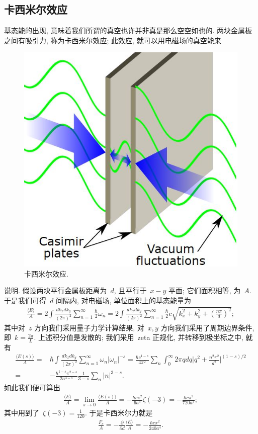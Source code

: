 \subsection{卡西米尔效应}


基态能的出现, 意味着我们所谓的真空也许并非真是那么空空如也的. 两块金属板之间有吸引力, 称为卡西米尔效应; 此效应, 就可以用电磁场的真空能来
\begin{figure}[!h]
\begin{center}
\includegraphics[width=5 cm]{pic/Casimir.jpg}
\caption{卡西米尔效应.}
\label{Casimir}
\end{center}
\end{figure}
说明. 假设两块平行金属板距离为~$d$, 且平行于~$x-y$ 平面; 它们面积相等, 为~$A$. 于是我们可得~$d$ 间隔内, 对电磁场, 单位面积上的基态能量为
\begin{align}
\frac{\langle E\rangle}{A}=2\int \frac{dk_xdk_y}{(2\pi)^2}\sum_{n=1}^\infty\frac{\hbar}{2}\omega_n=2\int \frac{dk_xdk_y}{(2\pi)^2}\sum_{n=1}^\infty\frac{\hbar}{2}c\sqrt{k^2_x+k^2_y+\left(\frac{n\pi}{d}\right)^2};
\end{align}
其中对~$z$ 方向我们采用量子力学计算结果, 对~$x, y$ 方向我们采用了周期边界条件, 即~$k=\frac{2\pi}{L}$. 上述积分值是发散的; 我们采用~zeta 正规化, 并转移到极坐标之中, 就有
\begin{align}
\frac{\langle E(s)\rangle}{A}=&\hbar\int \frac{dk_xdk_y}{(2\pi)^2}\sum_{n=1}^\infty\omega_n|\omega_n|^{-s}=\frac{\hbar c^{1-s}}{4\pi^2}\sum_n\int_0^\infty 2\pi q dq\Big|q^2+\frac{n^2\pi^2}{d^2}\Big|^{(1-s)/2}\nonumber\\
=&-\frac{\hbar^{1-s}\pi^{2-s}}{2a^{3-s}}\frac{1}{3-s}\sum_n|n|^{3-s}.
\end{align}
如此我们便可算出
\begin{align}
\frac{\langle E\rangle}{A}=\lim_{s\rightarrow0}\frac{\langle E(s)\rangle}{A}=-\frac{\hbar c\pi^2}{6a^3}\zeta(-3)=-\frac{\hbar c\pi^2}{720a^3};
\end{align}
其中用到了~$\zeta(-3)=\frac{1}{120}$. 于是卡西米尔力就是
\begin{align}
\frac{F_c}{A}=-\frac{\partial}{\partial d}\frac{\langle E\rangle}{A}=-\frac{\hbar c\pi^2}{240a^4}.
\end{align}



